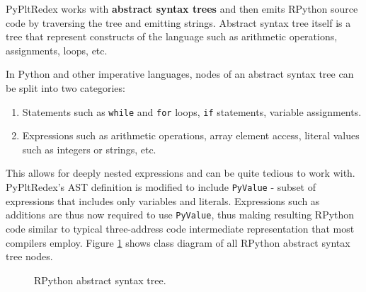 PyPltRedex works with \textbf{abstract syntax trees} and then emits RPython source code by traversing the tree and emitting strings. Abstract syntax tree itself is a tree that represent constructs of the language such as arithmetic operations, assignments, loops, etc.

In Python and other imperative languages, nodes of an abstract syntax tree can be split into two categories:

\begin{enumerate}
\item
Statements such as \texttt{while} and \texttt{for} loops, \texttt{if} statements, variable assignments.
\item
Expressions such as arithmetic operations, array element access, literal values such as integers or strings, etc.
\end{enumerate}

This allows for deeply nested expressions and can be quite tedious to work with. PyPltRedex's AST definition is modified to include \texttt{PyValue} - subset of expressions that includes only variables and literals. Expressions such as additions are thus now required to use \texttt{PyValue}, thus making resulting RPython code similar to typical three-address code intermediate representation that most compilers employ. Figure \ref{class-diagram-rpython} shows class diagram of all RPython abstract syntax tree nodes.

\begin{figure}[ht]
	\centering
	\caption{RPython abstract syntax tree.}
\label{class-diagram-rpython}
\end{figure}

